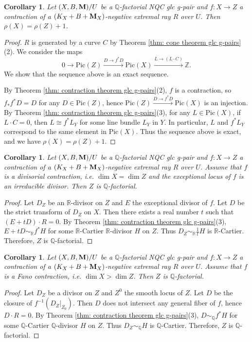 \documentclass[11pt]{amsart}
\numberwithin{equation}{section}
\newcommand{\Mm}{{\bf{M}}}
\newcommand{\Qq}{\mathbb{Q}}
\newcommand{\Rr}{\mathbb{R}}
\newcommand{\Pic}{\mathrm{Pic}}
\newtheorem{cor}[thm]{Corollary}
\theoremstyle{definition}
\theoremstyle{definition}
\theoremstyle{definition}
\begin{document}
\begin{cor}\label{cor: gpair negative extremal contraction picard number compare}
Let $(X,B,\Mm)/U$ be a $\Qq$-factorial NQC glc g-pair and $f: X\rightarrow Z$ a contraction of a $(K_X+B+\Mm_X)$-negative extremal ray $R$ over $U$. Then $\rho(X)=\rho(Z)+1$.
\end{cor}
\begin{proof}
$R$ is generated by a curve $C$ by Theorem \ref{thm: cone theorem glc g-pairs}(2). We consider the maps
$$0\rightarrow\Pic(Z)\xrightarrow{D\rightarrow f^*D}\Pic(X)\xrightarrow{L\rightarrow (L\cdot C)}\mathbb Z.$$
We show that the sequence above is an exact sequence.

By Theorem \ref{thm: contraction theorem glc g-pairs}(2), $f$ is a contraction, so $f_*f^*D=D$ for any $D\in\Pic(Z)$, hence $\Pic(Z)\xrightarrow{D\rightarrow f^*D}\Pic(X)$ is an injection. By Theorem \ref{thm: contraction theorem glc g-pairs}(3), for any $L\in\Pic(X)$, if $L\cdot C=0$, then $L\cong f^*L_Y$ for some  line bundle $L_Y$ in $Y$. In particular, $L$ and $f^*L_Y$ correspond to the same element in $\Pic(X)$. Thus the sequence above is exact, and we have $\rho(X)=\rho(Z)+1$.
\end{proof}

\begin{cor}\label{cor: gpair divisorial contraction q factoriality}
Let $(X,B,\Mm)/U$ be a $\Qq$-factorial NQC glc g-pair and $f: X\rightarrow Z$ a contraction of a $(K_X+B+\Mm_X)$-negative extremal ray $R$ over $U$. Assume that $f$ is a divisorial contraction, i.e. $\dim X=\dim Z$ and the exceptional locus of $f$ is an irreducible divisor. Then $Z$ is $\Qq$-factorial.
\end{cor}
\begin{proof}
Let $D_Z$ be an $\Rr$-divisor on $Z$ and $E$ the exceptional divisor of $f$. Let $D$ be the strict transform of $D_Z$ on $X$. Then there exists a real number $t$ such that $(E+tD)\cdot R=0$. By Theorem \ref{thm: contraction theorem glc g-pairs}(3), $E+tD\sim_{\Rr}f^*H$ for some $\Rr$-Cartier $\Rr$-divisor $H$ on $Z$. Thus $D_Z\sim_{\Rr}\frac{1}{t}H$ is $\Rr$-Cartier. Therefore, $Z$ is $\Qq$-factorial.
\end{proof}

\begin{cor}\label{cor: gpair fano contraction q factoriality}
Let $(X,B,\Mm)/U$ be a $\Qq$-factorial NQC glc g-pair and $f: X\rightarrow Z$ a contraction of a $(K_X+B+\Mm_X)$-negative extremal ray $R$ over $U$. Assume that $f$ is a Fano contraction, i.e. $\dim X>\dim Z$. Then $Z$ is $\Qq$-factorial.
\end{cor}
\begin{proof}
Let $D_Z$ be a divisor on $Z$ and $Z^0$ the smooth locus of $Z$. Let $D$ be the closure of $f^{-1}(D_Z|_{Z_0})$. Then $D$ does not intersect any general fiber of $f$, hence $D\cdot R=0$.  By Theorem \ref{thm: contraction theorem glc g-pairs}(3), $D\sim_{\Qq}f^*H$ for some $\Qq$-Cartier $\Qq$-divisor $H$ on $Z$. Thus $D_Z\sim_{\Qq}H$ is $\Qq$-Cartier. Therefore, $Z$ is $\Qq$-factorial.
\end{proof}
\end{document}
